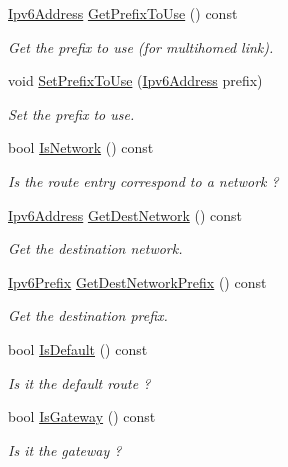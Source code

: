 \begin{DoxyCompactItemize}
\hyperlink{classns3_1_1Ipv6Address}{Ipv6\+Address} \hyperlink{classns3_1_1Ipv6RoutingTableEntry_a864ea62c2631d333718c35f8a887a09a}{Get\+Prefix\+To\+Use} () const 
\begin{DoxyCompactList}\small\item\em Get the prefix to use (for multihomed link). \end{DoxyCompactList}\item 
void \hyperlink{classns3_1_1Ipv6RoutingTableEntry_a79dbdd41584bf0396ddf1e7f98649793}{Set\+Prefix\+To\+Use} (\hyperlink{classns3_1_1Ipv6Address}{Ipv6\+Address} prefix)
\begin{DoxyCompactList}\small\item\em Set the prefix to use. \end{DoxyCompactList}\item 
bool \hyperlink{classns3_1_1Ipv6RoutingTableEntry_a180aec65e5415d2d9efa35b5cc9ec8e3}{Is\+Network} () const 
\begin{DoxyCompactList}\small\item\em Is the route entry correspond to a network ? \end{DoxyCompactList}\item 
\hyperlink{classns3_1_1Ipv6Address}{Ipv6\+Address} \hyperlink{classns3_1_1Ipv6RoutingTableEntry_a1b2e825a0db0168e0e6fd91f02b5323e}{Get\+Dest\+Network} () const 
\begin{DoxyCompactList}\small\item\em Get the destination network. \end{DoxyCompactList}\item 
\hyperlink{classns3_1_1Ipv6Prefix}{Ipv6\+Prefix} \hyperlink{classns3_1_1Ipv6RoutingTableEntry_ac72d00a536d36edc5ff939e1c7c6f9aa}{Get\+Dest\+Network\+Prefix} () const 
\begin{DoxyCompactList}\small\item\em Get the destination prefix. \end{DoxyCompactList}\item 
bool \hyperlink{classns3_1_1Ipv6RoutingTableEntry_a83304febe6c7db04019610bdb40b1f1d}{Is\+Default} () const 
\begin{DoxyCompactList}\small\item\em Is it the default route ? \end{DoxyCompactList}\item 
bool \hyperlink{classns3_1_1Ipv6RoutingTableEntry_aae1a34d547a152143df898cbc4a9157b}{Is\+Gateway} () const 
\begin{DoxyCompactList}\small\item\em Is it the gateway ? \end{DoxyCompactList}\item 

\end{DoxyCompactItemize}
